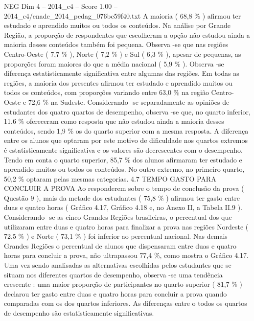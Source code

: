 \begin{textsample}{NEG Dim 4 – 2014\_c4 – Score 1.00 – 2014\_c4/enade\_2014\_pedag\_076bc59f40.txt}
A maioria ( 68,8 \% ) afirmou ter estudado e aprendido muitos ou todos os conteúdos.
Na análise por Grande Região, a proporção de respondentes que escolheram a opção não estudou ainda a maioria desses conteúdos também foi pequena.
Observa -se que nas regiões Centro-Oeste ( 7,7 \% ), Norte ( 7,2 \% ) e Sul ( 6,3 \% ), apesar de pequenas, as proporções foram maiores do que a média nacional ( 5,9 \% ).
Observa -se diferença estatisticamente significativa entre algumas das regiões.
Em todas as regiões, a maioria dos presentes afirmou ter estudado e aprendido muitos ou todos os conteúdos, com proporções variando entre 63,0 \% na região Centro-Oeste e 72,6 \% na Sudeste.
Considerando -se separadamente as opiniões de estudantes dos quatro quartos de desempenho, observa -se que, no quarto inferior, 11,6 \% ofereceram como resposta que não estudou ainda a maioria desses conteúdos, sendo 1,9 \% os do quarto superior com a mesma resposta.
A diferença entre os alunos que optaram por este motivo de dificuldade nos quartos extremos é estatisticamente significativa e os valores são decrescentes com o desempenho.
Tendo em conta o quarto superior, 85,7 \% dos alunos afirmaram ter estudado e aprendido muitos ou todos os conteúdos.
No outro extremo, no primeiro quarto, 50,2 \% optaram pelas mesmas categorias. 4.7 TEMPO GASTO PARA CONCLUIR A PROVA Ao responderem sobre o tempo de conclusão da prova ( Questão 9 ), mais da metade dos estudantes ( 75,8 \% ) afirmou ter gasto entre duas e quatro horas ( Gráfico 4.17, Gráfico 4.18 e, no Anexo II, a Tabela II.9 ).
Considerando -se as cinco Grandes Regiões brasileiras, o percentual dos que utilizaram entre duas e quatro horas para finalizar a prova nas regiões Nordeste ( 72,5 \% ) e Norte ( 73,1 \% ) foi inferior ao percentual nacional.
Nas demais Grandes Regiões o percentual de alunos que dispensaram entre duas e quatro horas para concluir a prova, não ultrapassou 77,4 \%, como mostra o Gráfico 4.17.
Uma vez sendo analisadas as alternativas escolhidas pelos estudantes que se situam nos diferentes quartos de desempenho, observa -se uma tendência crescente : uma maior proporção de participantes no quarto superior ( 81,7 \% ) declarou ter gasto entre duas e quatro horas para concluir a prova quando comparadas com os dos quartos inferiores.
As diferenças entre o todos os quartos de desempenho são estatisticamente significativas.

\end{textsample}

